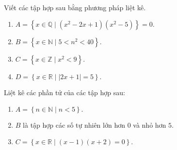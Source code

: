 \begin{bt}%
	Viết các tập hợp sau bằng phương pháp liệt kê.
	\begin{enumerate}
		\item $A=\left\{ x\in \mathbb{Q}\mid (x^2-2x+1)(x^2-5)\right\}=0$.
		\item $B=\left\{ x \in \mathbb{N}\mid 5<n^2<40\right\}$.
		\item $C=\left\{ x\in \mathbb{Z}\mid x^2<9\right\}$.
		\item $D=\left\{ x\in \mathbb{R}\mid \left|2x+1\right|=5\right\}$.
	\end{enumerate}
\end{bt}

\begin{bt}%
	Liệt kê các phần tử của các tập hợp sau:
	\begin{enumerate}
		\item $A=\left\{ n\in \mathbb{N} \mid n<5\right\}$.
		\item $B$ là tập hợp các số tự nhiên lớn hơn $0$ và nhỏ hơn $5$.
		\item $C=\left\{ x\in \mathbb{R}\mid (x-1)(x+2)=0\right\}$.
	\end{enumerate}
\end{bt}

